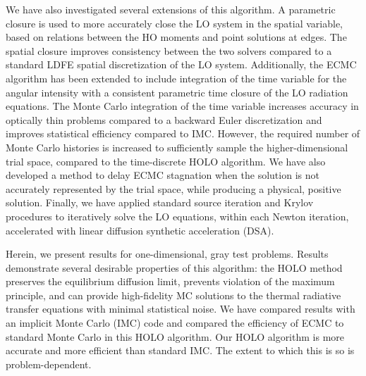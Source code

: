We have also investigated several extensions of this algorithm. A parametric closure is used to more
accurately close the LO system in the spatial variable, based on relations between the HO
moments and point solutions at edges. The spatial closure improves consistency between the two solvers compared to
a standard LDFE spatial discretization of the LO system.  Additionally, the ECMC algorithm has been extended to include
integration of the time variable for the angular intensity with a consistent parametric time closure of the LO
radiation equations.  The Monte Carlo integration of the time variable increases accuracy in optically thin problems compared to a
backward Euler discretization and improves statistical efficiency compared to IMC.
However, the required number of Monte Carlo histories is increased to sufficiently sample the
higher-dimensional trial space, compared to the time-discrete HOLO
algorithm.  We have also developed a method to delay ECMC stagnation when the solution is
not accurately represented by the trial space, while producing a physical, positive solution.  Finally, we have applied standard source iteration and Krylov procedures to iteratively solve the LO
equations, within each Newton iteration, accelerated with linear diffusion synthetic
acceleration (DSA).  

Herein, we present results for one-dimensional, gray test problems.  Results demonstrate
several desirable properties of this algorithm: the HOLO method preserves the equilibrium diffusion limit, prevents violation
of the maximum principle, and can provide high-fidelity MC solutions to the thermal
radiative transfer equations
with minimal statistical noise.  We have compared results with an implicit Monte Carlo
(IMC) code and compared the efficiency of ECMC to standard Monte Carlo in this HOLO
algorithm.  Our HOLO algorithm is more accurate and more efficient than standard IMC.  The
extent to which this is so is problem-dependent.

\pagebreak{}
